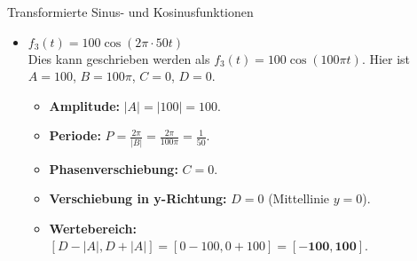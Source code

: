 \begin{loesungsumgebung}{Transformierte Sinus- und Kosinusfunktionen}
\begin{enumerate}[label=(\alph*)]
\begin{itemize}
        \item \textbf{$f_3(t) = 100 \cos(2\pi \cdot 50 t)$} \\
        Dies kann geschrieben werden als $f_3(t) = 100 \cos(100\pi t)$.
        Hier ist $A=100$, $B=100\pi$, $C=0$, $D=0$.
        \begin{itemize}
            \item \textbf{Amplitude:} $|A| = |100| = 100$.
            \item \textbf{Periode:} $P = \frac{2\pi}{|B|} = \frac{2\pi}{100\pi} = \frac{1}{50}$.
            \item \textbf{Phasenverschiebung:} $C = 0$.
            \item \textbf{Verschiebung in y-Richtung:} $D = 0$ (Mittellinie $y=0$).
            \item \textbf{Wertebereich:} $[D-|A|, D+|A|] = [0-100, 0+100] = \mathbf{[-100, 100]}$.
        \end{itemize}
    \end{itemize}


\end{enumerate}
\end{loesungsumgebung}
